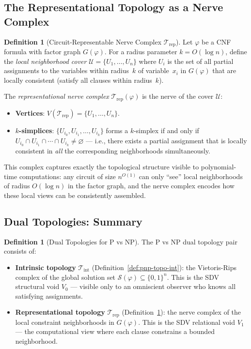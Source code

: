 \documentclass[11pt]{article}
\theoremstyle{definition}
\newtheorem{definition}[theorem]{Definition}
\theoremstyle{remark}
\newcommand{\calS}{\mathcal{S}}
\begin{document}
\subsection{The Representational Topology as a Nerve Complex}

\begin{definition}[Circuit-Representable Nerve Complex $\mathcal{T}_{\mathrm{rep}}$]
\label{def:pnp-topo-rep}
Let $\varphi$ be a CNF formula with factor graph $G(\varphi)$.  For a
radius parameter $k = O(\log n)$, define the \emph{local neighborhood
cover} $\mathcal{U} = \{U_1, \ldots, U_n\}$ where $U_i$ is the set
of all partial assignments to the variables within radius~$k$ of
variable~$x_i$ in $G(\varphi)$ that are locally consistent (satisfy
all clauses within radius~$k$).

The \emph{representational nerve complex} $\mathcal{T}_{\mathrm{rep}}(\varphi)$
is the nerve of the cover $\mathcal{U}$:
\begin{itemize}[nosep]
  \item \textbf{Vertices}: $V(\mathcal{T}_{\mathrm{rep}}) = \{U_1, \ldots, U_n\}$.
  \item \textbf{$k$-simplices}: $\{U_{i_0}, U_{i_1}, \ldots, U_{i_k}\}$ forms
    a $k$-simplex if and only if $U_{i_0} \cap U_{i_1} \cap \cdots \cap U_{i_k}
    \neq \varnothing$ --- i.e., there exists a partial assignment that is
    locally consistent in \emph{all} the corresponding neighborhoods
    simultaneously.
\end{itemize}
This complex captures exactly the topological structure visible to
polynomial-time computations: any circuit of size $n^{O(1)}$ can only
``see'' local neighborhoods of radius $O(\log n)$ in the factor graph,
and the nerve complex encodes how these local views can be consistently
assembled.
\end{definition}

\subsection{Dual Topologies: Summary}

\begin{definition}[Dual Topologies for P vs NP]
\label{def:pnp-topo}
The P vs NP dual topology pair consists of:
\begin{itemize}
\item \textbf{Intrinsic topology} $\mathcal{T}_{\mathrm{int}}$
  (Definition~\ref{def:pnp-topo-int}):
  the Vietoris-Rips complex of the global solution set
  $\calS(\varphi) \subseteq \{0,1\}^n$.  This is the SDV structural
  void $V_0$ --- visible only to an omniscient observer who knows
  all satisfying assignments.
\item \textbf{Representational topology} $\mathcal{T}_{\mathrm{rep}}$
  (Definition~\ref{def:pnp-topo-rep}):
  the nerve complex of the local constraint neighborhoods in $G(\varphi)$.
  This is the SDV relational void $V_1$ --- the computational view
  where each clause constrains a bounded neighborhood.
\end{itemize}
\end{definition}
\end{document}
